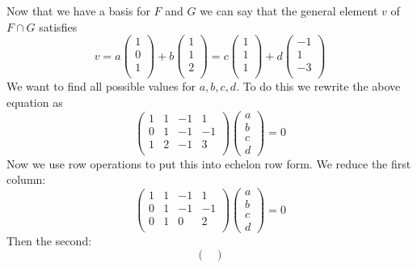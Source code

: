 \documentclass{article}
\newcommand{\chapternumber}{2}
\newenvironment{QandA}{\begin{enumerate}[label=\chapternumber.\arabic*]\bfseries\boldmath}
	{\end{enumerate}}
\newenvironment{answered}{\par\bigskip\normalfont\unboldmath}{}
\begin{document}
\begin{QandA}
\begin{answered}
			Now that we have a basis for $F$ and $G$ we can say that the general element $v$ of $F\cap G$ satisfies
			\[v
			= a
			\begin{pmatrix}
				1 \\
				0 \\
				1 \\
			\end{pmatrix}
			+ b
			\begin{pmatrix}
				1 \\
				1 \\
				2 \\
			\end{pmatrix}
			=
			c
			\begin{pmatrix}
				1 \\
				1 \\
				1 \\
			\end{pmatrix}
			+ d
			\begin{pmatrix}
				-1 \\
				1 \\
				-3 \\
			\end{pmatrix}
			\]
			We want to find all possible values for $a,b,c,d$. To do this we rewrite the above equation as
			\[
			\begin{pmatrix}
				1 & 1 & -1 & 1 \\
				0 & 1 & -1 & -1 \\
				1 & 2 & -1 & 3 \\
			\end{pmatrix}
			\begin{pmatrix}
				a \\ b \\ c \\ d 
			\end{pmatrix}
			= 0
			\]
			Now we use row operations to put this into echelon row form. We reduce the first column:
			\[
			\begin{pmatrix}
				1 & 1 & -1 & 1 \\
				0 & 1 & -1 & -1 \\
				0 & 1 & 0 & 2 \\
			\end{pmatrix}
			\begin{pmatrix}
				a \\ b \\ c \\ d 
			\end{pmatrix}
			= 0
			\]
			Then the second:
			\[
			\begin{pmatrix}

\end{pmatrix}\]
\end{answered}
\end{QandA}
\end{document}
